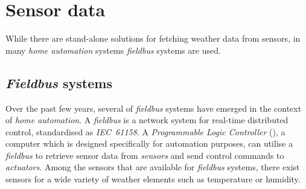 \section{Sensor data}
\label{sec:weather_sensors}

While there are stand-alone solutions for fetching weather data from sensors, in many \emph{home automation} systems \emph{fieldbus} systems are used.

\subsection{\emph{Fieldbus} systems}
\label{sec:fieldbus}

Over the past few years, several of \emph{fieldbus} systems have emerged in the context of \emph{home automation}. A \emph{fieldbus} is a network system for real-time distributed control\cite{fieldbus}, standardised as \emph{IEC~61158}\cite{IEC61158}. A \emph{Programmable Logic Controller} (), a computer which is designed specifically for automation purposes, can utilise a \emph{fieldbus} to retrieve sensor data from \emph{sensors} and send control commands to \emph{actuators}. Among the sensors that are available for \emph{fieldbus} systems, there exist sensors for a wide variety of weather elements such as temperature or humidity. 

